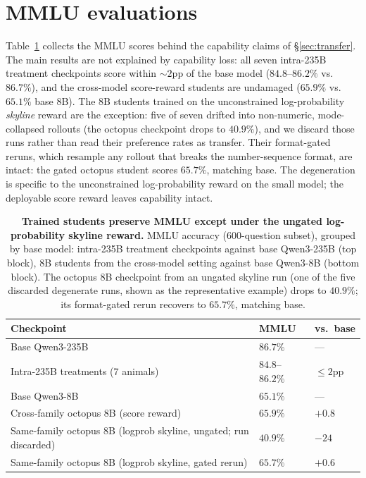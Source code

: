 \documentclass{article}
\begin{document}
\section{MMLU evaluations}
\label{app:mmlu}
Table~\ref{tab:mmlu} collects the MMLU scores behind the capability claims of
\S\ref{sec:transfer}. The main results are not explained by capability loss: all
seven intra-235B treatment checkpoints score within $\sim$$2$pp of the base model
($84.8$--$86.2\%$ vs.\ $86.7\%$), and the cross-model score-reward students are undamaged
($65.9\%$ vs.\ $65.1\%$ base 8B). The 8B students trained on the unconstrained
log-probability \emph{skyline} reward are the exception: five of seven drifted into
non-numeric, mode-collapsed rollouts (the octopus checkpoint drops to $40.9\%$), and we
discard those runs rather than read their preference rates as transfer. Their
format-gated reruns, which resample any rollout that breaks the number-sequence format,
are intact: the gated octopus student scores $65.7\%$, matching base. The degeneration is specific to the unconstrained log-probability reward on
the small model; the deployable score reward leaves capability intact.

\begin{table}[h]
\centering
\caption{\textbf{Trained students preserve MMLU except under the ungated
log-probability skyline reward.} MMLU accuracy (600-question subset), grouped by base
model: intra-235B treatment checkpoints against base Qwen3-235B (top block), 8B
students from the cross-model setting against base Qwen3-8B (bottom block). The octopus
8B checkpoint from an ungated skyline run (one of the five discarded degenerate runs,
shown as the representative example) drops to $40.9\%$; its format-gated rerun recovers
to $65.7\%$, matching base.}
\label{tab:mmlu}
\begin{tabularx}{\textwidth}{@{}>{\hsize=1.8\hsize\raggedright\arraybackslash}X >{\hsize=0.6\hsize\raggedleft\arraybackslash}X >{\hsize=0.6\hsize\raggedleft\arraybackslash}X@{}}
\toprule
Checkpoint & MMLU & vs.\ base \\
\midrule
Base Qwen3-235B & $86.7\%$ & --- \\
Intra-235B treatments (7 animals) & $84.8$--$86.2\%$ & $\le2$pp \\
\midrule
Base Qwen3-8B & $65.1\%$ & --- \\
Cross-family octopus 8B (score reward) & $65.9\%$ & $+0.8$ \\
Same-family octopus 8B (logprob skyline, ungated; run discarded) & $40.9\%$ & $-24$ \\
Same-family octopus 8B (logprob skyline, gated rerun) & $65.7\%$ & $+0.6$ \\
\bottomrule
\end{tabularx}
\end{table}
\end{document}
